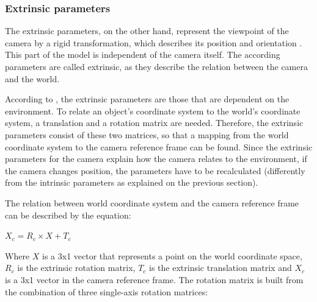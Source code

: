 \documentclass[msc, a4paper, classic, en]{ufbathesis}
\begin{document}
\subsubsection{Extrinsic parameters}

The extrinsic parameters, on the other hand, represent the viewpoint of the camera by a rigid transformation, which describes its position and orientation \cite{bajramovic2010self}. This part of the model is independent of the camera itself. The according parameters are called extrinsic, as they describe the relation between the camera and the world.

According to \cite{tillapaugh2008indirect}, the extrinsic parameters are those that are dependent on the environment. To relate an object's coordinate system to the world's coordinate system, a translation and a rotation matrix are needed. Therefore, the extrinsic parameters consist of these two matrices, so that a mapping from the world coordinate system to the camera reference frame can be found. Since the extrinsic parameters for the camera explain how the camera relates to the environment, if the camera changes position, the parameters have to be recalculated (differently from the intrinsic parameters as explained on the previous section).

The relation between world coordinate system and the camera reference frame can be described by the equation:

\begin{center}
$X_c = R_c \times X + T_c$
\end{center}

Where $X$ is a 3x1 vector that represents a point on the world coordinate space, $R_c$ is the extrinsic rotation matrix, $T_c$ is the extrinsic translation matrix and $X_c$ is a 3x1 vector in the camera reference frame. The rotation matrix is built from the combination of three single-axis rotation matrices:
\end{document}
